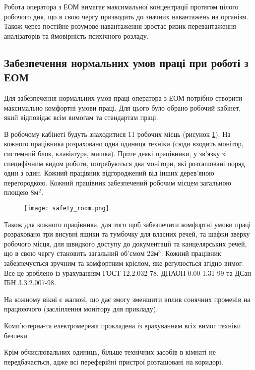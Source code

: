 \par Робота оператора з ЕОМ вимагає максимальної концентрації протягом цілого робочого дня, що в свою чергу призводить до значних навантажень на організм. Також через постійне розумове навантаження зростає ризик перевантаження аналізаторів та ймовірність психічного розладу.



\subsection{Забезпечення нормальних умов праці при роботі з ЕОМ}
\par Для забезпечення нормальних умов праці оператора з ЕОМ потрібно створити максимально комфортні умови праці. Для цього було обрано робочий кабінет, який відповідає всім вимогам та стандартам праці.
\par В робочому кабінеті будуть знаходитися 11 робочих місць (рисунок \ref{pic:safety_room}). На кожного працівника розраховано одна одиниця техніки (сюди входить монітор, системний блок, клавіатура, мишка). Проте деякі працівники, у зв'язку зі специфічним видом роботи, потребуються два монітори, які розташовані поряд один з один. Кожний працівник відгороджений від інших дерев'яною перегородкою. Кожний працівник забезпечений робочим місцем загальною площею 8м$^2$. 

\begin{figure}[!ht]
\centering
		\texttt{[image: safety\_room.png]}
		\label{pic:safety_room}
\end{figure}

\par Також для кожного працівника, для того щоб забезпечити комфортні умови праці розраховано три висувні ящики та тумбочку для власних речей, та шафки зверху робочого місця, для швидкого доступу до документації та канцелярських речей, що в свою чергу становить загальний об'ємом 22м$^3$. Кожний працівник забезпечується зручним та комфортним кріслом, яке регулюється згідно вимог. Все це зроблено із урахуванням ГОСТ 12.2.032-78\cite{safety_g_1}, ДНАОП 0.00-1.31-99\cite{safety_g_2} та ДСан ПіН 3.3.2.007-98\cite{safety_g_3}.

\par На кожному вікні є жалюзі, що дає змогу зменшити вплив сонячних променів на працюючого (засліплення монітору для прикладу).
\par Комп'ютерна-та електромережа прокладена із врахуванням всіх вимог техніки безпеки.
\par Крім обчислювальних одиниць, більше технічних засобів в кімнаті не передбачається, адже всі переферійні пристрої розташовані на коридорі.

